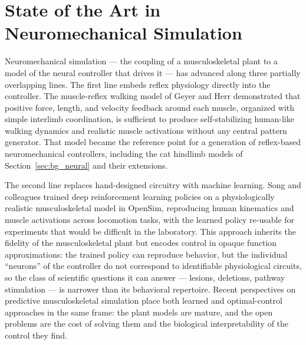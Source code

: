 
\section{State of the Art in Neuromechanical Simulation}\label{sec:bg_sota}

Neuromechanical simulation --- the coupling of a musculoskeletal plant to a model
of the neural controller that drives it --- has advanced along three partially
overlapping lines. The first line embeds reflex physiology directly into the
controller. The muscle-reflex walking model of Geyer and Herr
\citep{geyer_musclereflex_2010} demonstrated that positive force, length, and
velocity feedback around each muscle, organized with simple interlimb
coordination, is sufficient to produce self-stabilizing human-like walking
dynamics and realistic muscle activations without any central pattern generator.
That model became the reference point for a generation of reflex-based
neuromechanical controllers, including the cat hindlimb models of
Section~\ref{sec:bg_neural} \citep{markin_afferent_2010, shevtsova_modeling_2016}
and their extensions.

The second line replaces hand-designed circuitry with machine learning. Song and
colleagues \citep{song_deep_2021} trained deep reinforcement learning policies on
a physiologically realistic musculoskeletal model in OpenSim, reproducing human
kinematics and muscle activations across locomotion tasks, with the learned
policy re-usable for experiments that would be difficult in the laboratory. This
approach inherits the fidelity of the musculoskeletal plant but encodes control
in opaque function approximations: the trained policy can reproduce behavior, but
the individual ``neurons'' of the controller do not correspond to identifiable
physiological circuits, so the class of scientific questions it can answer ---
lesions, deletions, pathway stimulation --- is narrower than its behavioral
repertoire. Recent perspectives on predictive musculoskeletal simulation
\citep{degroote_perspective_2021} place both learned and optimal-control
approaches in the same frame: the plant models are mature, and the open problems
are the cost of solving them and the biological interpretability of the control
they find.

